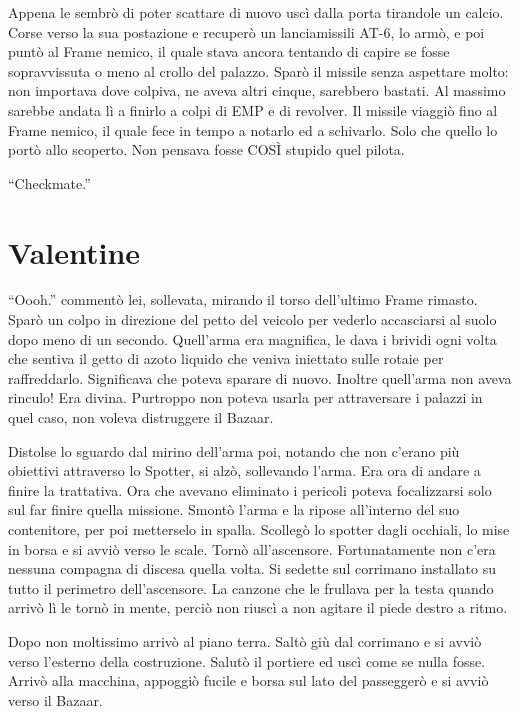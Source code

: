     Appena le sembrò di poter scattare di nuovo uscì dalla porta tirandole un calcio. Corse verso la sua postazione e
    recuperò un lanciamissili AT-6, lo armò, e poi puntò al Frame nemico, il quale stava ancora tentando di capire se
    fosse sopravvissuta o meno al crollo del palazzo. Sparò il missile senza aspettare molto: non importava dove
    colpiva, ne aveva altri cinque, sarebbero bastati. Al massimo sarebbe andata lì a finirlo a colpi di EMP e di
    revolver. Il missile viaggiò fino al Frame nemico, il quale fece in tempo a notarlo ed a schivarlo. Solo che quello
    lo portò allo scoperto. Non pensava fosse COSÌ stupido quel pilota.

    ``Checkmate.''

  \section*{Valentine}

    ``Oooh.'' commentò lei, sollevata, mirando il torso dell'ultimo Frame rimasto. Sparò un colpo in direzione del petto del
    veicolo per vederlo accasciarsi al suolo dopo meno di un secondo. Quell'arma era magnifica, le dava i brividi ogni
    volta che sentiva il getto di azoto liquido che veniva iniettato sulle rotaie per raffreddarlo. Significava che
    poteva sparare di nuovo. Inoltre quell'arma non aveva rinculo! Era divina. Purtroppo non poteva usarla per
    attraversare i palazzi in quel caso, non voleva distruggere il Bazaar.

    Distolse lo sguardo dal mirino dell'arma poi, notando che non c'erano più obiettivi attraverso lo Spotter, si alzò,
    sollevando l'arma. Era ora di andare a finire la trattativa. Ora che avevano eliminato i pericoli poteva
    focalizzarsi solo sul far finire quella missione. Smontò l'arma e la ripose all'interno del suo contenitore, per poi
    metterselo in spalla. Scollegò lo spotter dagli occhiali, lo mise in borsa e si avviò verso le scale. Tornò
    all'ascensore. Fortunatamente non c'era nessuna compagna di discesa quella volta. Si sedette sul corrimano
    installato su tutto il perimetro dell'ascensore. La canzone che le frullava per la testa quando arrivò lì le tornò
    in mente, perciò non riuscì a non agitare il piede destro a ritmo.

    Dopo non moltissimo arrivò al piano terra. Saltò giù dal corrimano e si avviò verso l'esterno della costruzione.
    Salutò il portiere ed uscì come se nulla fosse. Arrivò alla macchina, appoggiò fucile e borsa sul lato del
    passeggerò e si avviò verso il Bazaar.

